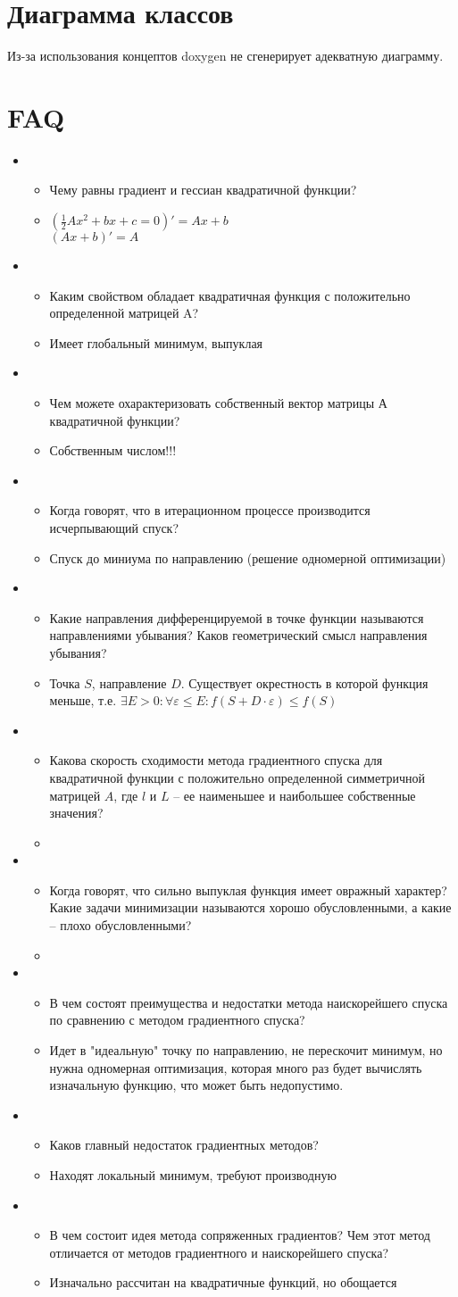 \documentclass[russian, english]{article}
\begin{document}
\section{Диаграмма классов}
Из-за использования концептов doxygen не сгенерирует адекватную диаграмму.


\section{FAQ}
\def\Question#1#2{
	\item\begin{itemize}
		\item[В] #1
		\item[О] #2
	\end{itemize}
}
\begin{itemize}
	\Question{Чему равны градиент и гессиан квадратичной функции?}{$(\frac{1}{2}Ax^2+bx+c=0)' = Ax + b$\\ $(Ax + b)' = A$}
	\Question{Каким свойством обладает квадратичная функция с положительно определенной матрицей A?}{Имеет глобальный минимум, выпуклая}
	\Question{Чем можете охарактеризовать собственный вектор матрицы $А$ квадратичной функции?}{Собственным числом!!!}
	\Question{Когда говорят, что в итерационном процессе производится исчерпывающий спуск?}{Спуск до миниума по направлению (решение одномерной оптимизации)}
	\Question{Какие направления дифференцируемой в точке функции называются направлениями убывания? Каков геометрический смысл направления убывания?}{Точка $S$, направление $D$. Существует окрестность в которой функция меньше, т.е. $\exists E > 0: \forall\varepsilon \le E: f(S+D\cdot\varepsilon)\le f(S)$}
	\Question{Какова скорость сходимости метода градиентного спуска для квадратичной функции с положительно определенной симметричной матрицей $A$, где $l$ и $L$ -- ее наименьшее и наибольшее собственные значения?}{}
	\Question{Когда говорят, что сильно выпуклая функция имеет овражный характер? Какие задачи минимизации называются хорошо обусловленными, а какие -- плохо обусловленными?}{}
	\Question{В чем состоят преимущества и недостатки метода наискорейшего спуска по сравнению с методом градиентного спуска?}{Идет в "идеальную" точку по направлению, не перескочит минимум, но нужна одномерная оптимизация, которая много раз будет вычислять изначальную функцию, что может быть недопустимо.}
	\Question{Каков главный недостаток градиентных методов?}{Находят локальный минимум, требуют производную}
	\Question{В чем состоит идея метода сопряженных градиентов? Чем этот метод отличается от методов градиентного и наискорейшего спуска?}{Изначально рассчитан на квадратичные функций, но обощается}
\end{itemize}
\end{document}
